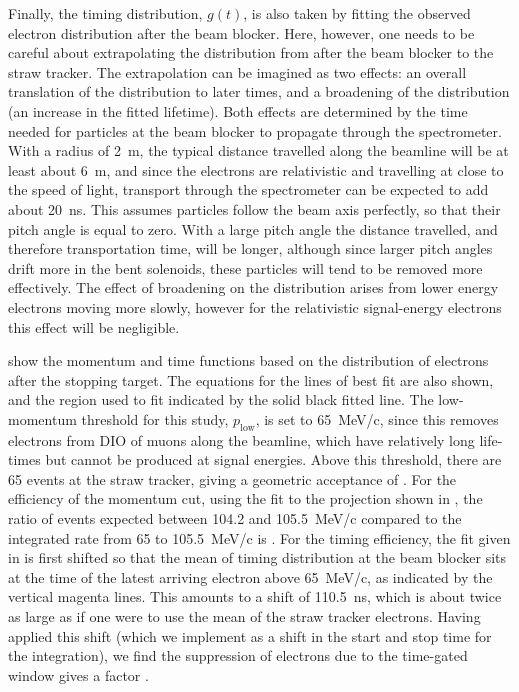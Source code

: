 Finally, the timing distribution, $g(t)$, is also taken by fitting the observed electron distribution after the beam blocker.
Here, however, one needs to be careful about extrapolating the distribution from after the beam blocker to the straw tracker.
The extrapolation can be imagined as two effects: an overall translation of the distribution to later times, and a broadening of the distribution (an increase in the fitted lifetime).
Both effects are determined by the time needed for particles at the beam blocker to propagate through the spectrometer.
With a radius of 2~m, the typical distance travelled along the beamline will be at least about 6~m, and since the electrons are relativistic and travelling at close to the speed of light, transport through the spectrometer can be expected to add about 20~ns.
This assumes particles follow the beam axis perfectly, so that their pitch angle is equal to zero.
With a large pitch angle the distance travelled, and therefore transportation time, will be longer, although since larger pitch angles drift more in the bent solenoids, these particles will tend to be removed more effectively.
The effect of broadening on the distribution arises from lower energy electrons moving more slowly, however for the relativistic signal-energy electrons this effect will be negligible.

 show the momentum and time functions based on the distribution of electrons after the stopping target.
The equations for the lines of best fit are also shown, and the region used to fit indicated by the solid black fitted line.
The low-momentum threshold for this study, $p_\textrm{low}$, is set to 65~MeV/c, since this removes electrons from \ac{DIO} of muons along the beamline, which have relatively long life-times but cannot be produced at signal energies.
Above this threshold, there are 65 events at the straw tracker, giving a geometric acceptance of \VarBeamBgGeometric.
For the efficiency of the momentum cut, using the fit to the projection shown in , the ratio of events expected between 104.2 and 105.5~MeV/c compared to the integrated rate from 65 to 105.5~MeV/c is \VarBeamBgMomentum.
For the timing efficiency, the fit given in  is first shifted so that the mean of timing distribution at the beam blocker sits at the time of the latest arriving electron above 65~MeV/c, as indicated
by the vertical magenta lines. 
This amounts to a shift of 110.5~ns, which is about twice as large as if one were to use the mean of the straw tracker electrons.
Having applied this shift (which we implement as a shift in the start and stop time for the integration), we find the suppression of electrons due to the time-gated window gives a factor \VarBeamBgTiming.

